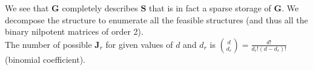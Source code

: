 \documentclass[12pt,a4paper]{report}
\begin{document}
	We see that $\boldsymbol{G}$ completely describes $\boldsymbol{S}$ that is in fact a sparse storage of $\boldsymbol{G}$.
	We decompose the structure to enumerate all the feasible structures (and thus all the binary nilpotent matrices of order 2).\\
	
	

			The number of possible $\boldsymbol{J}_r$ for given values of $d$ and $d_r$ is ${d \choose d_r}=\frac{d!}{d_r!(d-d_r)!}$ (binomial coefficient).\\
	
\end{document}
